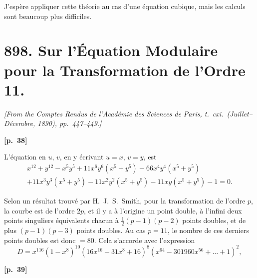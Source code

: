 \documentclass[11pt,a4paper]{article}
\theoremstyle{plain}
\begin{document}
J'esp\`ere appliquer cette th\'eorie au cas d'une \'equation cubique, mais les calculs sont beaucoup plus difficiles.

\newpage

\section*{898. Sur l'\'Equation Modulaire pour la Transformation de l'Ordre 11.}

\noindent\textit{[From the Comptes Rendus de l'Acad\'emie des Sciences de Paris, t.\ cxi.\ (Juillet--D\'ecembre, 1890), pp.\ 447--449.]}

\vspace{0.5em}
\noindent\textbf{[p.\ 38]}

L'\'equation en $u$, $v$, en y \'ecrivant $u = x$, $v = y$, est
\begin{multline*}
x^{12} + y^{12} - x^5 y^5 + 11x^6 y^6 (x^5 + y^5) - 66x^4 y^4 (x^5 + y^5)\\
+ 11x^3 y^3 (x^5 + y^5) - 11x^2 y^2 (x^5 + y^5) - 11xy(x^5 + y^5) - 1 = 0.
\end{multline*}

Selon un r\'esultat trouv\'e par H.\ J.\ S.\ Smith, pour la transformation de l'ordre $p$, la courbe est de l'ordre $2p$, et il y a \`a l'origine un point double, \`a l'infini deux points singuliers \'equivalents chacun \`a $\frac{1}{2}(p - 1)(p - 2)$ points doubles, et de plus $(p - 1)(p - 3)$ points doubles. Au cas $p = 11$, le nombre de ces derniers points doubles est donc $= 80$. Cela s'accorde avec l'expression
$$
D = x^{116}(1 - x^8)^{10}(16x^{16} - 31x^8 + 16)^8(x^{64} - 301960x^{56} + \ldots + 1)^2,
$$

\vspace{0.5em}
\noindent\textbf{[p.\ 39]}
\end{document}
